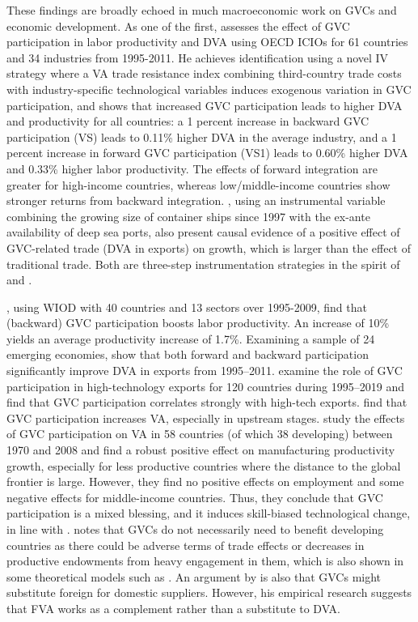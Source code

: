 \documentclass[a4paper]{article}
\begin{document}
These findings are broadly echoed in much macroeconomic work on GVCs and economic development. As one of the first, \citet{Kummritz20161} assesses the effect of GVC participation in labor productivity and DVA using OECD ICIOs for 61 countries and 34 industries from 1995-2011. He achieves identification using a novel IV strategy where a VA trade resistance index combining third-country trade costs with industry-specific technological variables induces exogenous variation in GVC participation, and shows that increased GVC participation leads to higher DVA and productivity for all countries: a 1 percent increase in backward GVC participation (VS) leads to 0.11\% higher DVA in the average industry, and a 1 percent increase in forward GVC participation (VS1) leads to 0.60\% higher DVA and 0.33\% higher labor productivity. The effects of forward integration are greater for high-income countries, whereas low/middle-income countries show stronger returns from backward integration. \citet{altomonte2018trade}, using an instrumental variable combining the growing size of container ships since 1997 with the ex-ante availability of deep sea ports, also present causal evidence of a positive effect of GVC-related trade (DVA in exports) on growth, which is larger than the effect of traditional trade. Both are three-step instrumentation strategies in the spirit of \citet{romer1999does} and \citet{feyrer2009distance, feyrer2019trade}. \newline 

\citet{constantinescu2019does}, using WIOD with 40 countries and 13 sectors over 1995-2009, find that (backward) GVC participation boosts labor productivity. An increase of 10\% yields an average productivity increase of 1.7\%. Examining a sample of 24 emerging economies, \citet{jangam2021does} show that both forward and backward participation significantly improve DVA in exports from 1995–2011. \citet{altun2023does} examine the role of GVC participation in high-technology exports for 120 countries during 1995–2019 and find that GVC participation correlates strongly with high-tech exports. \citet{kummritz2017economic} find that GVC participation increases VA, especially in upstream stages. \citet{pahl2020global} study the effects of GVC participation on VA in 58 countries (of which 38 developing) between 1970 and 2008 and find a robust positive effect on manufacturing productivity growth, especially for less productive countries where the distance to the global frontier is large. However, they find no positive effects on employment and some negative effects for middle-income countries. Thus, they conclude that GVC participation is a mixed blessing, and it induces skill-biased technological change, in line with \citet{rodrik2018new}. \citet{Kummritz20161} notes that GVCs do not necessarily need to benefit developing countries as there could be adverse terms of trade effects or decreases in productive endowments from heavy engagement in them, which is also shown in some theoretical models such as \citet{baldwin2014trade}. An argument by \citet{kummritz2015global} is also that GVCs might substitute foreign for domestic suppliers. However, his empirical research suggests that FVA works as a complement rather than a substitute to DVA. \newline   
\end{document}
